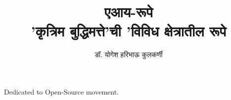 
\usepackage{fontspec}
\setmainfont[Script=Devanagari]{Nirmala Text}
\newfontfamily{}
\newfontfamily{}
\graphicspath{{images/}}

\date{}

\title{
    {\Huge \textbf{\color{titlecolor} एआय-रूपे}} \\ 
    \vspace{0.5em}
    {\large \color{subtitlecolor} 'कृत्रिम बुद्धिमत्ते'ची 'विविध क्षेत्रातील रूपे}
}

\author{\textsc{\color{authorcolor}डॉ. योगेश हरिभाऊ कुलकर्णी}}



\frontmatter
\maketitle

\begin{dedication}
Dedicated to Open-Source movement.
\end{dedication}

\tableofcontents

\mainmatter




